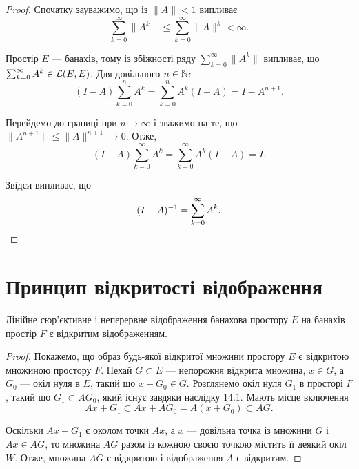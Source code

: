 \begin{proof}
Спочатку зауважимо, що із $\|A\| < 1$ випливає
\begin{equation*}
    \sum_{k = 0}^\infty \|A^k\| \le \sum_{k = 0}^\infty \|A\|^k < \infty.
\end{equation*}

Простір $E$ --- банахів, тому із збіжності ряду $\sum_{k = 0}^\infty \|A^k\|$
випливає, що $\sum_{k = 0}^\infty A^k \in \mathcal{L}(E, E)$. Для довільного $n \in \mathbb{N}$:
\begin{equation*}
    (I - A) \sum_{k = 0}^n A^k = \sum_{k = 0}^n A^k (I - A) = I - A^{n + 1}.
\end{equation*}

Перейдемо до границі при $n \to \infty$ і зважимо на те, що
$\|A^{n + 1}\| \le \|A\|^{n +1} \to 0$. Отже,
\begin{equation*}
    (I - A) \sum_{k = 0}^\infty A^k = \sum_{k = 0}^\infty A^k (I - A) = I.
\end{equation*}

Звідси випливає, що
\begin{equation*}
    (I - A)^{-1} = \sum_{k = 0}^\infty A^k. \qedhere
\end{equation*}
\end{proof}

\section{Принцип відкритості відображення}

\begin{theorem}
Лінійне сюр’єктивне і неперервне відображення банахова
простору $E$ на банахів простір $F$ є відкритим
відображенням.
\end{theorem}

\begin{proof}
Покажемо, що образ будь-якої відкритої
множини простору $E$ є відкритою множиною простору $F$.
Нехай $G \subset E$ --- непорожня відкрита множина, $x \in G$, а
$G_0$ --- окіл нуля в $E$, такий що $x + G_0 \in G$. Розглянемо
окіл нуля $G_1$ в просторі $F$, такий що $G_1 \subset A G_0$, який існує
завдяки наслідку 14.1. Мають місце включення
\begin{equation*}
    A x + G_1 \subset A x + A G_0 = A (x + G_0) \subset A G.
\end{equation*}

Оскільки $A x + G_1$ є околом точки $A x$, а $x$ --- довільна
точка із множини $G$ і $A x \in A G$, то множина $A G$ разом із
кожною своєю точкою містить її деякий окіл $W$. Отже,
множина $A G$ є відкритою і відображення $A$ є відкритим.
\end{proof}

